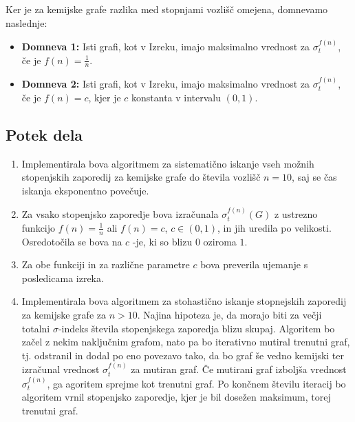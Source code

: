 \documentclass{article}
\begin{document}
Ker je za kemijske grafe razlika med stopnjami vozlišč omejena, domnevamo naslednje: 

\begin{itemize}
    \item \textbf{Domneva 1:} Isti grafi, kot v Izreku, imajo maksimalno vrednost za $\sigma_t^{f(n)}$, če je $f(n) = \frac{1}{n}$. 
    \item \textbf{Domneva 2:} Isti grafi, kot v Izreku, imajo maksimalno vrednost za $\sigma_t^{f(n)}$, če je $f(n) = c$, kjer je $c$ konstanta v intervalu $(0, 1)$. 

\end{itemize}


\subsection*{Potek dela}


\begin{enumerate}
    \item Implementirala bova algoritmem za sistematično iskanje vseh možnih stopenjskih zaporedij za 
    kemijske grafe do števila vozlišč $n=10$, saj se čas iskanja eksponentno povečuje.
    \item Za vsako stopenjsko zaporedje bova izračunala $\sigma_t^{f(n)}(G)$ z ustrezno funkcijo $f(n)= \frac{1}{n}$
     ali $f(n)= c$, $c \in (0,1)$, in jih uredila po velikosti. Osredotočila se bova na $c$ -je, ki so blizu $0$ oziroma $1$.
    \item Za obe funkciji in za različne parametre $c$ bova preverila ujemanje s 
    posledicama izreka. 
    \item Implementirala bova algoritmem za stohastično iskanje stopnejskih zaporedij za kemijske grafe za $n>10$.
    Najina hipoteza je, da morajo biti za večji totalni $\sigma$-indeks števila stopenjskega zaporedja blizu skupaj. 
    Algoritem bo začel z nekim naključnim grafom, nato pa bo iterativno mutiral trenutni graf, tj. odstranil in dodal po eno povezavo tako, da bo graf še vedno kemijski
    ter izračunal vrednost $\sigma_t^{f(n)}$ za mutiran graf.
    Če mutirani graf izboljša vrednost $\sigma_t^{f(n)}$, ga agoritem sprejme kot trenutni graf.
    Po končnem številu iteracij bo algoritem vrnil stopenjsko zaporedje, kjer je bil dosežen maksimum, torej trenutni graf.

\end{enumerate}
\end{document}
